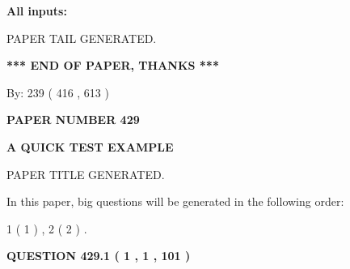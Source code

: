 \documentclass[12pt]{article}
\begin{document}
   
   
   
\noindent{}
   
   
   
   
\noindent\vspace{0.1in}\hspace{-0.08in} {\textbf{\Large{All inputs: }}}
   
   
   
   
   
   
 \vspace{0.2in}
 
   
   
\vspace{2.0in} PAPER TAIL GENERATED.
   
   
   
   
\vspace{1.0in} 
{\textbf{\large{ *** END OF PAPER, THANKS *** }}} 
   
   
\hspace{1.0in} By: 
 239 ( 416 ,  613 )
   
   
   
   
\newpage 
\setcounter{page}{ 
   429001 } 
   
   
   
   
 {\textbf{ \Large{ PAPER NUMBER  429  }}}
   
   
\vspace{0.2in}
   
   
   
   
   
   
   
   
 \vspace{0.2in}
{\LARGE {\textbf{ A QUICK TEST EXAMPLE}}}
   
   
 PAPER TITLE GENERATED.
   
   
   
\vspace{0.2in}
   
In this paper, big questions will be generated in the following order: 
   
   
   1 ( 1 )
 ,
   2 ( 2 )
 .
  
\vspace{0.2in}
  
{\textbf{\Large{QUESTION
429.1 
 ( 1 , 1 , 101 )
}}}
  
  
 
\end{document}
